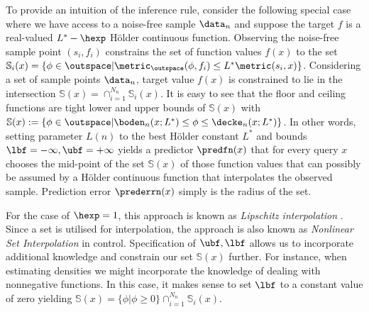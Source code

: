 To provide an intuition of the inference rule, consider the following special case where we have access to a noise-free sample $\data_n$ and suppose 
the target $f$ is a real-valued $L^*-\hexp$ H\"older continuous function. Observing the noise-free sample point $(s_i,f_i)$ constrains the set of function values $f(x)$ to the set $\mathbb S_i(x) =\{ \phi \in \outspace | \metric_\outspace(\phi, f_i) \leq L^* \metric(s_i,x) \}$. Considering a set of sample points $\data_n$, target value $f(x)$ is constrained to lie in the intersection $\mathbb S(x)=\cap_{i=1}^{N_n} \mathbb S_i(x)$. It is easy to see that the floor and ceiling functions are tight lower and upper bounds of $\mathbb S(x)$ with $\mathbb S(x) := \{ \phi \in \outspace | \boden_n(x; L^*) \leq \phi \leq \decke_n(x;L^*)\}$. In other words, setting parameter $L(n)$ to the best H\"older constant $L^*$ and bounds $\lbf =-\infty,\ubf=+\infty$ yields a predictor $\predfn(x)$ that for every query $x$ chooses the mid-point of the set $\mathbb S(x)$ of those function values that can possibly be assumed by a H\"older continuous function that interpolates the observed sample. Prediction error $\prederrn(x)$ simply is the radius of the set.

For the case of $\hexp=1$, this approach is known as \emph{Lipschitz interpolation} \cite{Beliakov2006,Zabinsky2003}. Since a set is utilised for interpolation, the approach is also known as \emph{Nonlinear Set Interpolation} \cite{Milanese2004,Canale2014} in control. Specification of $\ubf,\lbf$ allows us to incorporate additional knowledge and constrain our set $\mathbb S(x)$ further. 
For instance, when estimating densities we might incorporate the knowledge of dealing with nonnegative functions. In this case, it makes sense to set $\lbf$ to a constant value of zero yielding $\mathbb S(x) = \{\phi | \phi \geq 0 \} \cap_{i=1}^{N_n} \mathbb S_i(x) $.

